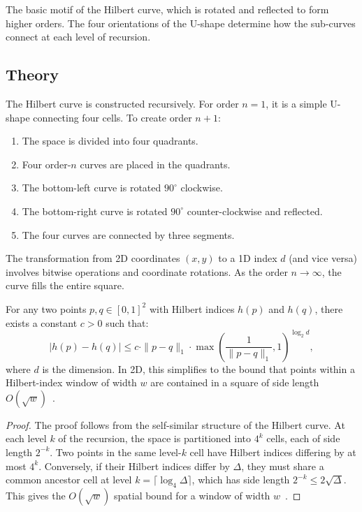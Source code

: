 \begin{definition}[U-shape]\label{def:u_shape}
The basic motif of the Hilbert curve, which is rotated and reflected to form higher orders. The four orientations of the U-shape determine how the sub-curves connect at each level of recursion.
\end{definition}

\subsection{Theory}
The Hilbert curve is constructed recursively. For order $n=1$, it is a simple U-shape connecting four cells. To create order $n+1$:
\begin{enumerate}
    \item The space is divided into four quadrants.
    \item Four order-$n$ curves are placed in the quadrants.
    \item The bottom-left curve is rotated $90^\circ$ clockwise.
    \item The bottom-right curve is rotated $90^\circ$ counter-clockwise and reflected.
    \item The four curves are connected by three segments.
\end{enumerate}

The transformation from 2D coordinates $(x, y)$ to a 1D index $d$ (and vice versa) involves bitwise operations and coordinate rotations. As the order $n \to \infty$, the curve fills the entire square.

\begin{theorem}\label{thm:hilbert_locality}
For any two points $p, q \in [0,1]^2$ with Hilbert indices $h(p)$ and $h(q)$, there exists a constant $c > 0$ such that:
\[
|h(p) - h(q)| \le c \cdot \|p - q\|_1 \cdot \max\!\left(\frac{1}{\|p - q\|_1}, 1\right)^{\log_2 d},
\]
where $d$ is the dimension. In 2D, this simplifies to the bound that points within a Hilbert-index window of width $w$ are contained in a square of side length $O(\sqrt{w})$~\cite{moon2001}.
\end{theorem}

\begin{proof}
The proof follows from the self-similar structure of the Hilbert curve. At each level $k$ of the recursion, the space is partitioned into $4^k$ cells, each of side length $2^{-k}$. Two points in the same level-$k$ cell have Hilbert indices differing by at most $4^k$. Conversely, if their Hilbert indices differ by $\Delta$, they must share a common ancestor cell at level $k = \lceil \log_4 \Delta \rceil$, which has side length $2^{-k} \le 2\sqrt{\Delta}$. This gives the $O(\sqrt{w})$ spatial bound for a window of width $w$~\cite{moon2001}.
\end{proof}

